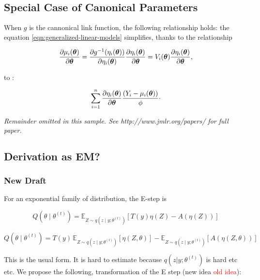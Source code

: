 \documentclass[twoside,11pt]{article}
\begin{document}
\subsection{Special Case of Canonical Parameters}
When $g$ is the cannonical link function, the following relationship holds:
the equation  \eqref{eqn:generalized-linear-models} simplifies, thanks to the relationship

$$
\frac{\partial \mu_i({\bm{\theta}})}{\partial{\bm{\theta}}} = \frac{\partial g^{-1}(\eta_i({\bm{\theta}}))}{\partial \eta_i({\bm{\theta}})}\frac{\partial \eta_i({\bm{\theta}})}{\partial{\bm{\theta}}} = V_i({\bm{\theta}})\frac{\partial \eta_i({\bm{\theta}})}{\partial{\bm{\theta}}},
$$

to :

\begin{equation}
    \sum_{i=1}^n \frac{\partial\eta_i({\bm{\theta}})}{\partial{\bm{\theta}}}\frac{(Y_i - \mu_i({\bm{\theta}}))}{\phi}\cdot
    \label{eqn:generalized-linear-models-cannonical}
\end{equation}


{\noindent \em Remainder omitted in this sample. See http://www.jmlr.org/papers/ for full paper.}




\newpage


\subsection{Derivation as EM?}


\subsubsection{New Draft}
For an exponential family of distribution, the E-step is

$$Q(\theta \mid \theta^{(t)}) = \mathbb{E}_{Z\sim q(z \mid y; \theta^{(t)})} \left[ T(y) {\eta(Z)} - A(\eta(Z)) \right]$$

$$
Q(\theta \mid \theta^{(t)}) = T(y) \, \mathbb{E}_{Z\sim q(z \mid y; \theta^{(t)})} \left[ {\eta(Z, \theta)} \right] - \mathbb{E}_{Z\sim q(z \mid y; \theta^{(t)})} \left[ A(\eta(Z, \theta)) \right]
$$

This is the usual form. It is hard to estimate because $q(z|y; \theta^{(t)})$ is hard etc etc. We propose the following, transformation of the E step (\textcolor{softgreen}{new idea} \textcolor{red}{old idea}):
\end{document}
